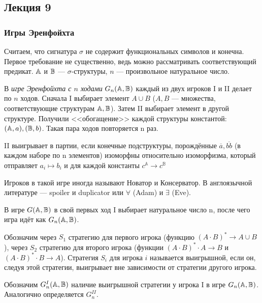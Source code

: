 \subsection{Лекция 9}

\subsubsection{Игры Эренфойхта}

Считаем, что сигнатура $\sigma$ не содержит функциональных символов и конечна. Первое требование не существенно, ведь можно рассматривать соответствующий предикат. ${\mathbb A}$ и ${\mathbb B}$ — $\sigma$-структуры, $n$ — произвольное натуральное число.

\begin{definition}
    В \emph{игре Эренфойхта с $n$ ходами} $G_n({\mathbb A}, {\mathbb B})$ каждый из двух игроков I и II  делает по $n$ ходов. Сначала I выбирает элемент $A\cup B$ ($A, B$ — множества, соответствующие структурам ${\mathbb A}, {\mathbb B}$). Затем II выбирает элемент в другой структуре. Получили <<обогащение>> каждой структуры константой: $({\mathbb A}, a), ({\mathbb B}, b)$. Такая пара ходов повторяется n раз.

    II выигрывает в партии, если конечные подструктуры, порождённые $\overline{a}, \overline{bb}$ (в каждом наборе по n элементов) изоморфны относительно изоморфизма, который отправляет $a_i \mapsto b_i$ и для каждой константы $c^{\mathbb{A}}\to c^{\mathbb{B}}$
\end{definition}

\begin{remark}
    Игроков в такой игре иногда называют Новатор и Консерватор. В англоязычной литературе — spoiler и duplicator или $\forall$ (Adam) и $\exists$ (Eve).
\end{remark}

\begin{definition}
    В игре $G({\mathbb A}, {\mathbb B})$ в свой первых ход I выбирает натуральное число n, после чего игра идёт как $G_n({\mathbb A}, {\mathbb B})$.
\end{definition}

Обозначим через $S_1$ стратегию для первого игрока (функцию $(A\cdot B)^*\to A\cup B$), через $S_2$ стратегию для второго игрока (функции $(A\cdot B)^*\cdot A\to B$ и $(A\cdot B)^*\cdot B\to A$). Стратегия $S_i$ для игрока $i$ называется выигрышной, если он, следуя этой стратегии, выигрывает вне зависимости от стратегии другого игрока.

Обозначим $G_n^I({\mathbb A}, {\mathbb B})$ наличие выигрышной стратегии у игрока I в игре $G_n({\mathbb A}, {\mathbb B})$. Аналогично определяется $G_n^{II}$.

